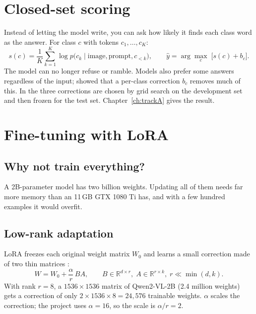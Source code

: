 \section{Closed-set scoring}
\label{sec:closedset}

Instead of letting the model write, you can ask how likely it finds each class word as the answer. For class $c$ with tokens $c_1,\dots,c_K$:
\begin{equation}
s(c) = \frac{1}{K}\sum_{k=1}^{K}\log p\bigl(c_k \mid \text{image}, \text{prompt}, c_{<k}\bigr),
\qquad
\hat{y} = \arg\max_{c}\; \bigl[s(c) + b_c\bigr].
\label{eq:closedset}
\end{equation}
The model can no longer refuse or ramble. Models also prefer some answers regardless of the input; \citet{zhao2021calibrate} showed that a per-class correction $b_c$ removes much of this. In  the three corrections are chosen by grid search on the development set and then frozen for the test set. Chapter~\ref{ch:trackA} gives the result.

\section{Fine-tuning with LoRA}
\label{sec:lora}

\subsection{Why not train everything?}

A 2B-parameter model has two billion weights. Updating all of them needs far more memory than an 11\,GB GTX 1080 Ti has, and with a few hundred examples it would overfit.

\subsection{Low-rank adaptation}

LoRA freezes each original weight matrix $W_0$ and learns a small correction made of two thin matrices \citep{hu2022lora}:
\begin{equation}
W = W_0 + \frac{\alpha}{r}\,BA, \qquad B\in\mathbb{R}^{d\times r},\; A\in\mathbb{R}^{r\times k},\; r \ll \min(d,k).
\label{eq:lora}
\end{equation}
With rank $r = 8$, a $1536\times1536$ matrix of Qwen2-VL-2B (2.4 million weights) gets a correction of only $2 \times 1536 \times 8 = 24{,}576$ trainable weights. $\alpha$ scales the correction; the project uses $\alpha = 16$, so the scale is $\alpha/r = 2$.

